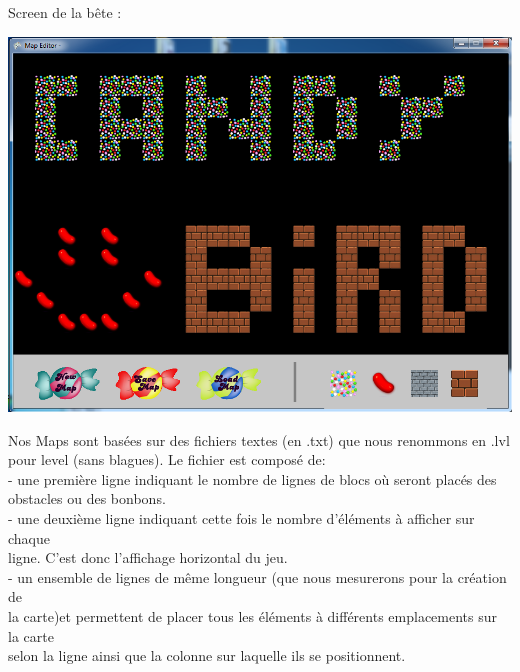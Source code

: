 \documentclass [11pt]{report}
\begin{document}
	\noindent Screen de la bête : 
						
		\vspace{4mm}
		
			\begin{center}
			\includegraphics[scale = 0.4]{images/EditeurMap.png}
			\end{center}
			
			
			
		\newpage
			
			
			
			Nos Maps sont basées sur des fichiers textes (en .txt) que nous renommons en .lvl pour level (sans blagues). Le fichier est composé de:\\
						
						\indent- une première ligne indiquant le nombre de lignes de blocs où seront placés des \\\indent obstacles ou des bonbons.\\
						
						\indent- une deuxième ligne indiquant cette fois le nombre d'éléments à afficher sur chaque\\\indent ligne. C'est donc l'affichage horizontal du jeu.\\
						
						\indent- un ensemble de lignes de même longueur (que nous mesurerons pour la création de \\\indent la carte)et permettent de placer tous les éléments à différents emplacements sur la carte\\\indent selon la ligne ainsi que la colonne sur laquelle ils se positionnent.
						
\end{document}
